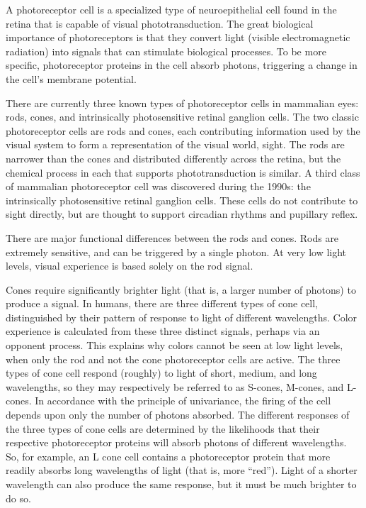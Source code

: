 \documentclass[]{book}
\begin{document}
A photoreceptor cell is a specialized type of neuroepithelial cell found in the retina that is capable of visual phototransduction. The great biological importance of photoreceptors is that they convert light (visible electromagnetic radiation) into signals that can stimulate biological processes. To be more specific, photoreceptor proteins in the cell absorb photons, triggering a change in the cell's membrane potential.

There are currently three known types of photoreceptor cells in mammalian eyes: rods, cones, and intrinsically photosensitive retinal ganglion cells. The two classic photoreceptor cells are rods and cones, each contributing information used by the visual system to form a representation of the visual world, sight. The rods are narrower than the cones and distributed differently across the retina, but the chemical process in each that supports phototransduction is similar. A third class of mammalian photoreceptor cell was discovered during the 1990s: the intrinsically photosensitive retinal ganglion cells. These cells do not contribute to sight directly, but are thought to support circadian rhythms and pupillary reflex.

There are major functional differences between the rods and cones. Rods are extremely sensitive, and can be triggered by a single photon. At very low light levels, visual experience is based solely on the rod signal.

Cones require significantly brighter light (that is, a larger number of photons) to produce a signal. In humans, there are three different types of cone cell, distinguished by their pattern of response to light of different wavelengths. Color experience is calculated from these three distinct signals, perhaps via an opponent process. This explains why colors cannot be seen at low light levels, when only the rod and not the cone photoreceptor cells are active. The three types of cone cell respond (roughly) to light of short, medium, and long wavelengths, so they may respectively be referred to as S-cones, M-cones, and L-cones. In accordance with the principle of univariance, the firing of the cell depends upon only the number of photons absorbed. The different responses of the three types of cone cells are determined by the likelihoods that their respective photoreceptor proteins will absorb photons of different wavelengths. So, for example, an L cone cell contains a photoreceptor protein that more readily absorbs long wavelengths of light (that is, more ``red''). Light of a shorter wavelength can also produce the same response, but it must be much brighter to do so.
\end{document}
